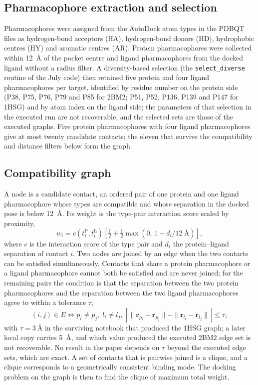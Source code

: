 \documentclass{iopjournal}
\begin{document}
\subsection{Pharmacophore extraction and selection}
\label{sec:pharma}
Pharmacophores were assigned from the AutoDock atom types in the PDBQT files as hydrogen-bond acceptors (HA), hydrogen-bond donors (HD), hydrophobic centres (HY) and aromatic centres (AR). Protein pharmacophores were collected within \SI{12}{\angstrom} of the pocket centre and ligand pharmacophores from the docked ligand without a radius filter. A diversity-based selection (the \texttt{select\_diverse} routine of the July code) then retained five protein and four ligand pharmacophores per target, identified by residue number on the protein side (P38, P75, P76, P79 and P85 for 2BM2; P51, P52, P136, P139 and P147 for 1HSG) and by atom index on the ligand side; the parameters of that selection in the executed run are not recoverable, and the selected sets are those of the executed graphs. Five protein pharmacophores with four ligand pharmacophores give at most twenty candidate contacts; the eleven that survive the compatibility and distance filters below form the graph.

\subsection{Compatibility graph}
\label{sec:graph}
A node is a candidate contact, an ordered pair of one protein and one ligand pharmacophore whose types are compatible and whose separation in the docked pose is below \SI{12}{\angstrom}. Its weight is the type-pair interaction score scaled by proximity,
\begin{equation}
\label{eq:weight}
w_i = c(t_i^{\mathrm{P}}, t_i^{\mathrm{L}}) \left[\tfrac{1}{2} + \tfrac{1}{2}\max\!\left(0,\, 1 - d_i/\SI{12}{\angstrom}\right)\right],
\end{equation}
where $c$ is the interaction score of the type pair and $d_i$ the protein--ligand separation of contact $i$. Two nodes are joined by an edge when the two contacts can be satisfied simultaneously. Contacts that share a protein pharmacophore or a ligand pharmacophore cannot both be satisfied and are never joined; for the remaining pairs the condition is that the separation between the two protein pharmacophores and the separation between the two ligand pharmacophores agree to within a tolerance $\tau$,
\begin{equation}
\label{eq:edge}
(i,j)\in E \iff p_i \neq p_j,\; l_i \neq l_j,\; \left|\,\|\mathbf{r}_{p_i}-\mathbf{r}_{p_j}\| - \|\mathbf{r}_{l_i}-\mathbf{r}_{l_j}\|\,\right| \le \tau ,
\end{equation}
with $\tau = \SI{3}{\angstrom}$ in the surviving notebook that produced the 1HSG graph; a later local copy carries \SI{5}{\angstrom}, and which value produced the executed 2BM2 edge set is not recoverable. No result in the paper depends on $\tau$ beyond the executed edge sets, which are exact. A set of contacts that is pairwise joined is a clique, and a clique corresponds to a geometrically consistent binding mode. The docking problem on the graph is then to find the clique of maximum total weight.
\end{document}
